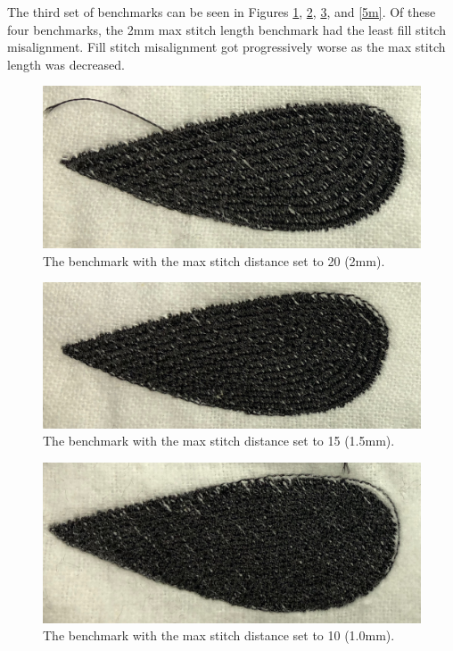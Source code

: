 \documentclass{article}
\begin{document}
The third set of benchmarks can be seen in Figures \ref{20m}, \ref{15m}, \ref{10m}, and \ref{5m}. Of these four benchmarks, the 2mm max stitch length benchmark had the least fill stitch misalignment. Fill stitch misalignment got progressively worse as the max stitch length was decreased.

\begin{figure}[H]
    \centering
    \includegraphics[width=4.7in]{20m}
    \caption{The benchmark with the max stitch distance set to 20 (2mm).}
    \label{20m}
\end{figure}

\begin{figure}[H]
    \centering
    \includegraphics[width=4.7in]{15m}
    \caption{The benchmark with the max stitch distance set to 15 (1.5mm).}
    \label{15m}
\end{figure}

\begin{figure}[H]
    \centering
    \includegraphics[width=4.7in]{10m}
    \caption{The benchmark with the max stitch distance set to 10 (1.0mm).}
    \label{10m}
\end{figure}
\end{document}
